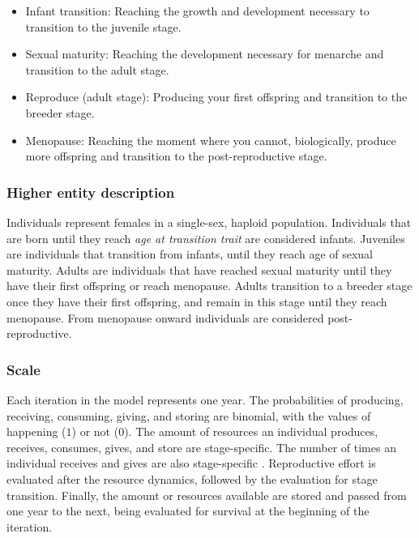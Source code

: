 \documentclass{article}
\begin{document}
\begin{itemize}
    \begin{itemize}
        \item Infant transition: Reaching the growth and development necessary to transition to the juvenile stage.
        \item Sexual maturity: Reaching the development necessary for menarche and transition to the adult stage.
        \item Reproduce (adult stage): Producing your first offspring and transition to the breeder stage.
        \item Menopause: Reaching the moment where you cannot, biologically, produce more offspring and transition to the post-reproductive stage.
    \end{itemize}
\end{itemize}

\subsubsection{Higher entity description}

Individuals represent females in a single-sex, haploid population. Individuals that are born until they reach \emph{age at transition trait} are considered infants. Juveniles are individuals that transition from infants, until they reach age of sexual maturity. Adults are individuals that have reached sexual maturity until they have their first offspring or reach menopause. Adults transition to a breeder stage once they have their first offspring, and remain in this stage until they reach menopause. From menopause onward individuals are considered post-reproductive.

\subsubsection{Scale}

Each iteration in the model represents one year. The probabilities  of producing, receiving, consuming, giving, and storing are binomial, with the values of happening ($1$) or not ($0$). The amount of resources an individual produces, receives, consumes, gives, and store are stage-specific. The number of times an individual receives and gives are also stage-specific . Reproductive effort is evaluated after the resource dynamics, followed by the evaluation for stage transition. Finally, the amount or resources available are stored and passed from one year to the next, being evaluated for survival at the beginning of the iteration.
\end{document}
